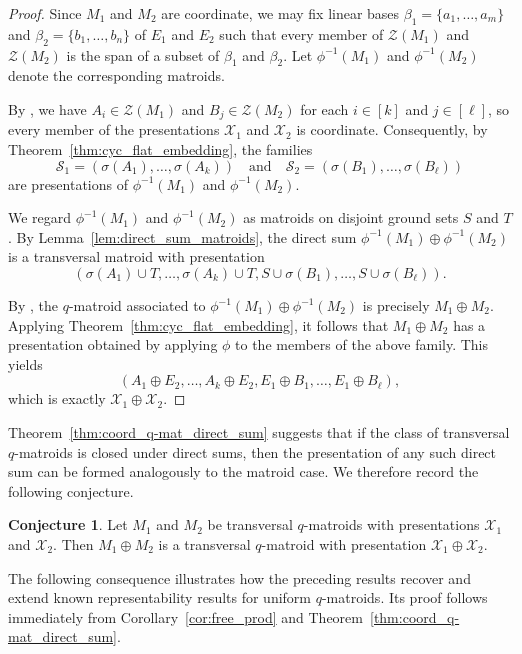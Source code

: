 \documentclass{article}
\theoremstyle{definition}
\newtheorem{conjecture}[theorem]{{{Conjecture}}}
\begin{document}
\begin{proof}
Since $M_1$ and $M_2$ are coordinate, we may fix linear bases
$\beta_1=\{a_1,\dots,a_m\}$ and $\beta_2=\{b_1,\dots,b_n\}$ of $E_1$ and $E_2$
such that every member of $\mathcal{Z}(M_1)$ and $\mathcal{Z}(M_2)$ is the span of a subset of $\beta_1$ and $\beta_2$. Let $\phi^{-1}(M_1)$ and $\phi^{-1}(M_2)$ denote the corresponding matroids.

By \cite[Theorems 21 and 23]{saaltink2025theoryqtransversals}, we have $A_i\in\mathcal{Z}(M_1)$ and $B_j\in\mathcal{Z}(M_2)$ for each $i\in[k]$ and $j\in[\ell]$, so every member of the presentations $\mathcal{X}_1$ and $\mathcal{X}_2$ is coordinate. Consequently, by Theorem~\ref{thm:cyc_flat_embedding}, the families
\[
\mathcal{S}_1=(\sigma(A_1),\dots,\sigma(A_k))
\quad\text{and}\quad
\mathcal{S}_2=(\sigma(B_1),\dots,\sigma(B_\ell))
\]
are presentations of $\phi^{-1}(M_1)$ and $\phi^{-1}(M_2)$.

We regard $\phi^{-1}(M_1)$ and $\phi^{-1}(M_2)$ as matroids on disjoint ground sets $S$ and $T$. By Lemma~\ref{lem:direct_sum_matroids}, the direct sum $\phi^{-1}(M_1)\oplus\phi^{-1}(M_2)$ is a transversal matroid with presentation
\[
(\sigma(A_1)\cup T,\dots,\sigma(A_k)\cup T,S\cup\sigma(B_1),\dots,S\cup\sigma(B_\ell)).
\]

By \cite[Theorem 6.2]{GluesingLuerssenJany2024}, the $q$-matroid associated to $\phi^{-1}(M_1)\oplus\phi^{-1}(M_2)$ is precisely $M_1\oplus M_2$. Applying Theorem~\ref{thm:cyc_flat_embedding}, it follows that $M_1\oplus M_2$ has a presentation obtained by applying $\phi$ to the members of the above family. This yields
\[
(A_1\oplus E_2,\dots,A_k\oplus E_2,E_1\oplus B_1,\dots,E_1\oplus B_\ell),
\]
which is exactly $\mathcal{X}_1\oplus\mathcal{X}_2$.
\end{proof}

Theorem~\ref{thm:coord_q-mat_direct_sum} suggests that if the class of transversal $q$-matroids is closed under direct sums, then the presentation of any such direct sum can be formed analogously to the matroid case. We therefore record the following conjecture.

\begin{conjecture}
Let $M_1$ and $M_2$ be transversal $q$-matroids with presentations $\mathcal{X}_1$ and $\mathcal{X}_2$. Then $M_1\oplus M_2$ is a transversal $q$-matroid with presentation $\mathcal{X}_1\oplus\mathcal{X}_2$.
\end{conjecture}

The following consequence illustrates how the preceding results recover and extend known representability results for uniform $q$-matroids. Its proof follows immediately from Corollary~\ref{cor:free_prod} and Theorem~\ref{thm:coord_q-mat_direct_sum}.
\end{document}
